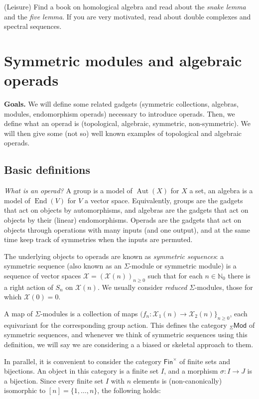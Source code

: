 \documentclass[fleqn, a4paper, twoside]{article}
\newcommand{\0}{\langle 0\rangle}
\newcommand{\XX}{\mathcal{X}}
\newcommand{\End}{\operatorname{End}}
\DeclareRobustCommand{\[}{\begin{equation}}%
\DeclareRobustCommand{\]}{\end{equation}}%
\theoremstyle{mytheorem}
\theoremstyle{introthm}
\theoremstyle{mydefinition}
\theoremstyle{mydefinition2}
\theoremstyle{plain} %
\newcommand{\GSet}{\mathsf{Fin}^\times}
\newcommand{\SMod}{{}_\Sigma\mathsf{Mod}}
\newcommand{\?}{\,?\,}
\newcommand{\NN}{\mathbb N}
\theoremstyle{mytheorem}
\theoremstyle{plain} %
\newcommand\blankpage{%
    \null
    \thispagestyle{empty}%
    \newpage}
\begin{document}
\begin{question} (Leisure) Find a book on homological algebra
and read about the \emph{snake lemma} and the \emph{five lemma}.
If you are very motivated, read about double complexes and spectral
sequences.
\end{question} 

\afterpage{\blankpage}

\newpage
\section{Symmetric modules and algebraic operads}

\textbf{Goals.}
We will define
some related gadgets (symmetric collections,
algebras, modules, endomorphism operads)
necessary to introduce operads. 
Then, we define what an operad is (topological,
algebraic, symmetric, non-symmetric). 
We will then give some
(not so) well known examples of topological
and algebraic operads.

\subsection{Basic definitions}
\emph{What is an operad?} A group is a model of
$\operatorname{Aut}(X)$ for $X$ a set, an algebra
is a model of $\End(V)$ for $V$
a vector space. Equivalently, groups are the
gadgets that act on objects by automorphisms,
and algebras are the gadgets that act
on objects by their (linear) endomorphisms. 
Operads are the gadgets that act on
objects through operations with many 
inputs (and one output), and at the same
time keep track of symmetries when
the inputs are permuted.

The underlying objects to operads are known as
\emph{symmetric sequences}: a symmetric sequence
(also known as an $\Sigma$-module or symmetric 
module) is a sequence of vector spaces
$\XX = (\XX(n))_{n\geqslant 0}$ such that for
each $n\in\NN_0$ there is a right action of
$S_n$ on $\XX(n)$. We usually consider \emph{reduced}
$\Sigma$-modules, those for which $\XX(0)=0$.

A map of $\Sigma$-modules is a collection of maps
$(f_n : \XX_1(n) \longrightarrow \XX_2(n)\}_{n\geqslant 0}$,
each equivariant for the corresponding group action. 
This defines the category $\SMod$ of symmetric
sequences, and whenever we think of symmetric sequences
using this definition, we will say we are considering a 
a biased or skeletal approach to them.

In parallel, it is convenient to consider the 
category $\GSet$ of finite sets and bijections.
An object in this category is a finite set $I$,
and a morphism $\sigma : I\longrightarrow J$ is a
bijection. Since every finite set $I$ with $n$
elements is (non-canonically) isomorphic to 
$[n] =\{1,\ldots,n\}$, the following holds:
\end{document}

